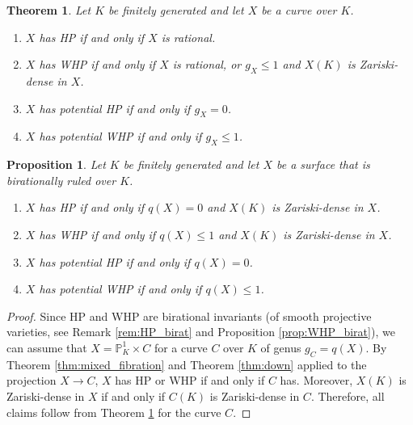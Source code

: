 \documentclass[10pt,a4paper]{amsart}
\newtheorem{proposition}{Proposition}
\newtheorem{theorem}{Theorem}
\begin{document}
\begin{theorem}\label{thm:curves}
Let $K$ be finitely generated
and let $X$ be a 
 curve over $K$.
 \begin{enumerate}
\item $X$ has HP if and only if $X$ is rational. 
\item  $X$ has WHP if and only if $X$ is rational, or $g_X\leq 1$ and  $X(K)$ is Zariski-dense in $X$.  
\item $X$ has potential HP if and only if $g_X=0$.
\item $X$ has potential WHP if and only if   $g_X\leq 1$.
\end{enumerate}
\end{theorem}

\begin{proposition}\label{prop:uniruled}
    Let $K$ be finitely generated and let $X$ be a surface that is birationally ruled over $K$.
    \begin{enumerate}
        \item $X$ has HP if and only if $q(X)=0$ and $X(K)$ is Zariski-dense in $X$.
        \item $X$ has WHP if and only if $q(X)\leq 1$ and $X(K)$ is Zariski-dense in $X$.
        \item $X$ has potential HP if and only if $q(X)=0$.
        \item $X$ has potential WHP if and only if $q(X)\leq 1$.
    \end{enumerate}
\end{proposition}

\begin{proof}
Since HP and WHP are birational invariants (of smooth projective varieties, see Remark \ref{rem:HP_birat} and Proposition \ref{prop:WHP_birat}),
we can assume that $X=\mathbb{P}^1_K\times C$ for a curve $C$ over $K$ of genus $g_C=q(X)$.
By Theorem \ref{thm:mixed_fibration} and Theorem \ref{thm:down}
applied to the projection $X\rightarrow C$,
$X$ has HP or WHP if and only if $C$ has.
Moreover, $X(K)$ is Zariski-dense in $X$ if and only if $C(K)$ is Zariski-dense in $C$.
Therefore, all claims follow from Theorem \ref{thm:curves} for the curve $C$.
\end{proof}
\end{document}
